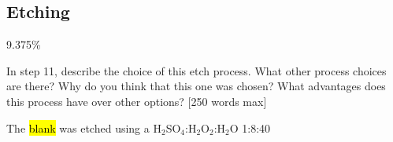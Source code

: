 \subsection{Etching}
\label{sec:fab:etching}

9.375\%

In step 11, describe the choice of this etch process. What other process choices are there? Why do you think that this one was chosen? What advantages does this process have over other options? [250 words max]

The \hl{blank} was etched using a H$_{2}$SO$_{4}$:H$_{2}$O$_{2}$:H$_{2}$O 1:8:40
